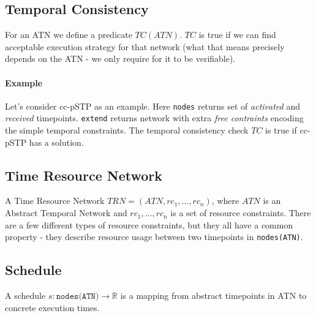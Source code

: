 \documentclass{article}
\begin{document}
\begin{multicols}{2}
\subsection{Temporal Consistency}
\label{temporal_consistency}
For an ATN we define a predicate $TC(ATN)$. $TC$ is true if we can find acceptable execution strategy for that network (what that means precisely depends on the ATN - we only require for it to be verifiable).
\paragraph{Example} Let's consider cc-pSTP \cite{Fang2014} as an example. Here \texttt{nodes} returns set of \textit{activated} and \textit{received} timepoints. \texttt{extend} returns network with extra \textit{free contraints} encoding the simple temporal constraints. The temporal consistency check $TC$ is true if cc-pSTP has a solution.
\subsection{Time Resource Network}
A Time Resource Network $TRN = (ATN, {rc_1, ..., rc_n})$, where $ATN$ is an Abstract Temporal Network and ${rc_1, ..., rc_n}$ is a set of resource constraints. There are a few different types of resource constraints, but they all have a common property - they describe resource usage between two timepoints in \texttt{nodes(ATN)}.
\subsection{Schedule}
A schedule $s: \texttt{nodes(ATN)} \rightarrow \mathbb{R}$ is a mapping from abstract timepoints in ATN to concrete execution times.

\end{multicols}
\end{document}
